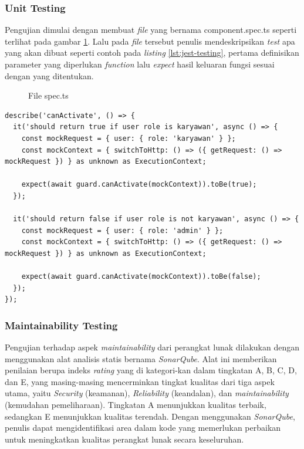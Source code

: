 \subsubsection{Unit Testing}
Pengujian dimulai dengan membuat \textit{file} yang bernama component.spec.ts seperti terlihat pada gambar \ref{ut1}. Lalu pada \textit{file} tersebut penulis mendeskripsikan \textit{test} apa yang akan dibuat seperti contoh pada \textit{listing} \ref{lst:jest-testing}, pertama definisikan parameter yang diperlukan \textit{function} lalu \textit{expect} hasil keluaran fungsi sesuai dengan yang ditentukan.
\begin{figure}[h]
  {\par}
  \caption{File spec.ts}
  \label{ut1}
\end{figure}

\begin{lstlisting}[caption={Contoh Testing Menggunakan Jest},label={lst:jest-testing}]
  describe('canActivate', () => {
  it('should return true if user role is karyawan', async () => {
    const mockRequest = { user: { role: 'karyawan' } };
    const mockContext = { switchToHttp: () => ({ getRequest: () => mockRequest }) } as unknown as ExecutionContext;

    expect(await guard.canActivate(mockContext)).toBe(true);
  });

  it('should return false if user role is not karyawan', async () => {
    const mockRequest = { user: { role: 'admin' } };
    const mockContext = { switchToHttp: () => ({ getRequest: () => mockRequest }) } as unknown as ExecutionContext;

    expect(await guard.canActivate(mockContext)).toBe(false);
  });
});
\end{lstlisting}
\subsubsection{Maintainability Testing}
Pengujian terhadap aspek \textit{maintainability} dari perangkat lunak dilakukan dengan menggunakan alat analisis statis bernama \textit{SonarQube}. Alat ini memberikan penilaian berupa indeks \textit{rating} yang di kategori-kan dalam tingkatan A, B, C, D, dan E, yang masing-masing mencerminkan tingkat kualitas dari tiga aspek utama, yaitu \textit{Security} (keamanan), \textit{Reliability} (keandalan), dan \textit{maintainability} (kemudahan pemeliharaan). Tingkatan A menunjukkan kualitas terbaik, sedangkan E menunjukkan kualitas terendah. Dengan menggunakan \textit{SonarQube}, penulis dapat mengidentifikasi area dalam kode yang memerlukan perbaikan untuk meningkatkan kualitas perangkat lunak secara keseluruhan.


